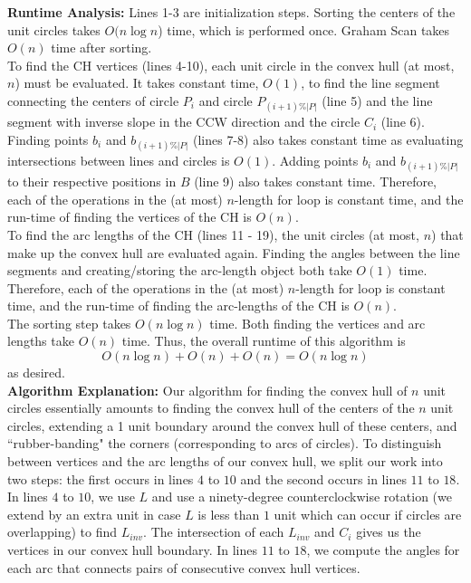 \documentclass[11pt]{article}
\begin{document}
\begin{enumerate}
    \vspace{1cm}
    
    \textbf{Runtime Analysis:} Lines 1-3 are initialization steps. Sorting the centers of the unit circles takes $O(n\log n$) time, which is performed once. Graham Scan takes $O(n)$ time after sorting. \\

    To find the CH vertices (lines 4-10), each unit circle in the convex hull (at most, $n$) must be evaluated. It takes constant time, $O(1)$, to find the line segment connecting the centers of circle $P_i$ and circle $P_{(i+1)\%|P|}$ (line 5) and the line segment with inverse slope in the CCW direction and the circle $C_i$ (line 6). Finding points $b_i$ and $b_{(i+1)\%|P|}$ (lines 7-8) also takes constant time as evaluating intersections between lines and circles is $O(1)$. Adding points $b_i$ and $b_{(i+1)\%|P|}$ to their respective positions in $B$ (line 9) also takes constant time. Therefore, each of the operations in the (at most) $n$-length for loop is constant time, and the run-time of finding the vertices of the CH is $O(n)$. \\

    To find the arc lengths of the CH (lines 11 - 19), the unit circles (at most, $n$) that make up the convex hull are evaluated again. Finding the angles between the line segments and creating/storing the arc-length object both take $O(1)$ time. Therefore, each of the operations in the (at most) $n$-length for loop is constant time, and the run-time of finding the arc-lengths of the CH is $O(n)$. \\

    The sorting step takes $O(n\log n)$ time. Both finding the vertices and arc lengths take $O(n)$ time. Thus, the overall runtime of this algorithm is \[O(n \log n) + O(n) + O(n) = O(n\log n)\] as desired. \\

    \textbf{Algorithm Explanation:} Our algorithm for finding the convex hull of $n$ unit circles essentially amounts to finding the convex hull of the centers of the $n$ unit circles, extending a 1 unit boundary around the convex hull of these centers, and ``rubber-banding" the corners (corresponding to arcs of circles). To distinguish between vertices and the arc lengths of our convex hull, we split our work into two steps: the first occurs in lines $4$ to $10$ and the second occurs in lines $11$ to $18$. \\
    
    In lines $4$ to $10$, we use $L$ and use a ninety-degree counterclockwise rotation (we extend by an extra unit in case $L$ is less than $1$ unit which can occur if circles are overlapping) to find $L_{inv}.$ The intersection of each $L_{inv}$ and $C_i$ gives us the vertices in our convex hull boundary. In lines $11$ to $18$, we compute the angles for each arc that connects pairs of consecutive convex hull vertices. \\


\end{enumerate}
\end{document}
